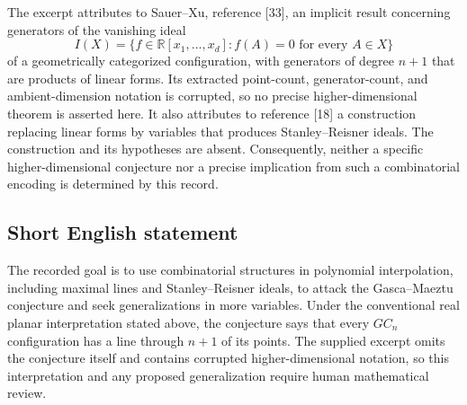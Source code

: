 \documentclass[11pt]{article}
\newcommand{\R}{\mathbb{R}}
\begin{document}
The excerpt attributes to Sauer--Xu, reference [33], an implicit result concerning generators of the vanishing ideal
\[
I(X)=\{f\in\R[x_1,\ldots,x_d]:f(A)=0\text{ for every }A\in X\}
\]
of a geometrically categorized configuration, with generators of degree \(n+1\) that are products of linear forms. Its extracted point-count, generator-count, and ambient-dimension notation is corrupted, so no precise higher-dimensional theorem is asserted here. It also attributes to reference [18] a construction replacing linear forms by variables that produces Stanley--Reisner ideals. The construction and its hypotheses are absent. Consequently, neither a specific higher-dimensional conjecture nor a precise implication from such a combinatorial encoding is determined by this record.
\subsection{Short English statement}
The recorded goal is to use combinatorial structures in polynomial interpolation, including maximal lines and Stanley--Reisner ideals, to attack the Gasca--Maeztu conjecture and seek generalizations in more variables. Under the conventional real planar interpretation stated above, the conjecture says that every \(GC_n\) configuration has a line through \(n+1\) of its points. The supplied excerpt omits the conjecture itself and contains corrupted higher-dimensional notation, so this interpretation and any proposed generalization require human mathematical review.
\end{document}
